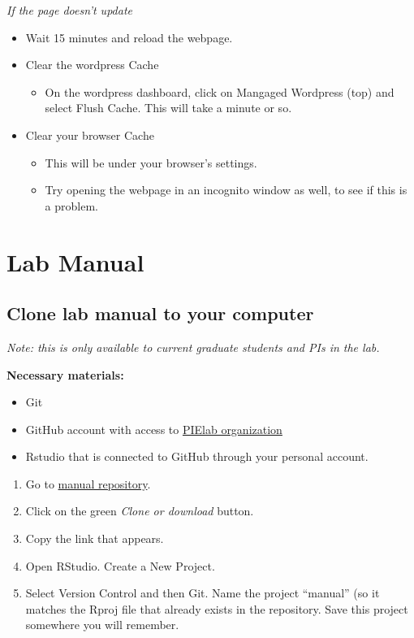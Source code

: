 \documentclass[]{book}
\providecommand{\tightlist}{%
  \setlength{\itemsep}{0pt}\setlength{\parskip}{0pt}}
\begin{document}
\emph{If the page doesn't update}

\begin{itemize}
\tightlist
\item
  Wait 15 minutes and reload the webpage.
\item
  Clear the wordpress Cache

  \begin{itemize}
  \tightlist
  \item
    On the wordpress dashboard, click on Mangaged Wordpress (top) and select Flush Cache. This will take a minute or so.
  \end{itemize}
\item
  Clear your browser Cache

  \begin{itemize}
  \tightlist
  \item
    This will be under your browser's settings.
  \item
    Try opening the webpage in an incognito window as well, to see if this is a problem.
  \end{itemize}
\end{itemize}

\hypertarget{lab-manual}{%
\section{Lab Manual}\label{lab-manual}}

\hypertarget{clone-lab-manual-to-your-computer}{%
\subsection{Clone lab manual to your computer}\label{clone-lab-manual-to-your-computer}}

\emph{Note: this is only available to current graduate students and PIs in the lab.}

\textbf{Necessary materials:}

\begin{itemize}
\tightlist
\item
  Git
\item
  GitHub account with access to \href{https://github.com/orgs/pie-lab}{PIElab organization}
\item
  Rstudio that is connected to GitHub through your personal account.
\end{itemize}

\begin{enumerate}
\def\labelenumi{\arabic{enumi}.}
\tightlist
\item
  Go to \href{https://github.com/pie-lab/manual}{manual repository}.
\item
  Click on the green \emph{Clone or download} button.
\item
  Copy the link that appears.
\item
  Open RStudio. Create a New Project.
\item
  Select Version Control and then Git. Name the project ``manual'' (so it matches the Rproj file that already exists in the repository. Save this project somewhere you will remember.
\end{enumerate}
\end{document}
